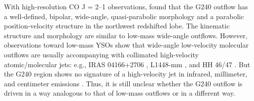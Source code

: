 With high-resolution CO J = 2--1 observations, \citet{2009ApJ...696...66Q} found that the G240 outflow has a well-defined, bipolar, wide-angle, quasi-parabolic morphology and a parabolic position-velocity structure in the northwest redshifted lobe. The kinematic structure and morphology are similar to low-mass wide-angle outflows. However, observations toward low-mass YSOs show that wide-angle low-velocity molecular outflows are usually accompanying with collimated high-velocity atomic/molecular jets: e.g., IRAS 04166+2706 \citep{2009A&A...495..169S}, L1448-mm \citep{2010ApJ...717...58H}, and HH 46/47 \citep{2007ApJ...668L.159V}. But the G240 region shows no signature of a high-velocity jet in infrared, millimeter, and centimeter emissions \citep{2002ApJ...576..313K, 2009ApJ...696...66Q, 2011AJ....142..147T}. Thus, it is still unclear whether the G240 outflow is driven in a way analogous to that of low-mass outflows or in a different way.


